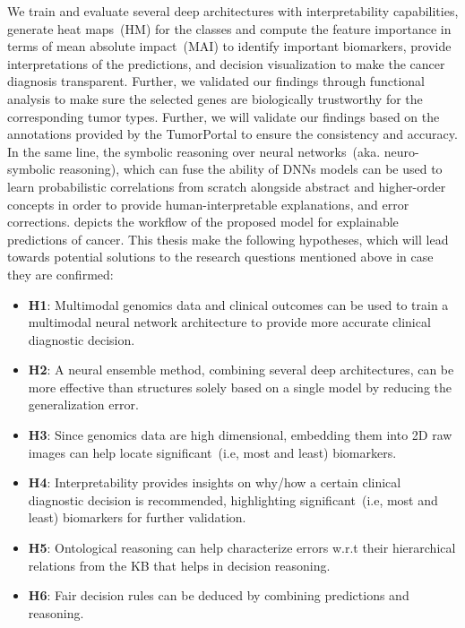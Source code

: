 \hspace*{3.5mm} We train and evaluate several deep architectures with interpretability capabilities, generate heat maps~(HM) for the classes and compute the feature importance in terms of mean absolute impact~(MAI) to identify important biomarkers, provide interpretations of the predictions, and decision visualization to make the cancer diagnosis transparent. Further, we validated our findings through functional analysis to make sure the selected genes are biologically trustworthy for the corresponding tumor types. Further, we will validate our findings based on the annotations provided by the TumorPortal to ensure the consistency and accuracy. In the same line, the symbolic reasoning over neural networks~(aka. neuro-symbolic reasoning), which can fuse the ability of DNNs models can be used to learn probabilistic correlations from scratch alongside abstract and higher-order concepts in order to provide human-interpretable explanations, and error corrections.  depicts the workflow of the proposed model for explainable predictions of cancer. This thesis make the following hypotheses, which will lead towards potential solutions to the research questions mentioned above in case they are confirmed:

\begin{itemize}[noitemsep]
    \item \textbf{H1}: Multimodal genomics data and clinical outcomes can be used to train a multimodal neural network architecture to provide more accurate clinical diagnostic decision. 
    \item \textbf{H2}: A neural ensemble method, combining several deep architectures, can be more effective than structures solely based on a single model by reducing the generalization error. 
    \item \textbf{H3}: Since genomics data are high dimensional, embedding them into 2D raw images can help locate significant~(i.e, most and least) biomarkers. 
    \item \textbf{H4}: Interpretability provides insights on why/how a certain clinical diagnostic decision is recommended, highlighting significant~(i.e, most and least) biomarkers for further validation. 
    \item \textbf{H5}: Ontological reasoning can help characterize errors w.r.t their hierarchical relations from the KB that helps in decision reasoning.
    \item \textbf{H6}: Fair decision rules can be deduced by combining predictions and reasoning. 
\end{itemize}

